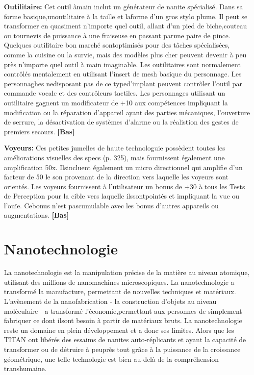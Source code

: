 \textbf{Outilitaire:} Cet outil àmain inclut un générateur de nanite spécialisé. Dans sa forme basique,unoutilitaire à la taille et laforme d'un gros stylo plume. Il peut se transformer en quasiment n'importe quel outil, allant d'un pied de biche,couteau ou tournevis de puissance à une fraiseuse en passant parune paire de pince. Quelques outilitaire bon marché sontoptimisés pour des tâches spécialisées, comme la cuisine ou la survie, mais des modèles plus cher peuvent devenir à peu près n'importe quel outil à main imaginable. Les outilitaires sont normalement contrôlés mentalement en utilisant l'insert de mesh basique du personnage. Les personnaghes nedisposant pas de ce typed'implant peuvent contrôler l'outil par commande vocale et des contrôleurs tactiles. Les personnages utilisant un outilitaire gagnent un modificateur de +10 aux compétences impliquant la modification ou la réparation d'appareil ayant des parties mécaniques, l'ouverture de serrure, la désactivation de systèmes d'alarme ou la réalistion des gestes de premiers secours. \textbf{[Bas]} 

\textbf{Voyeurs:} Ces petites jumelles de haute technologuie possèdent toutes les améliorations visuelles des specs (p. 325), mais fournissent également une amplification 50x. Ilsincluent également un micro directionnel qui amplifie d'un facteur de 50 le son provenant de la direction vers laquelle les voyeurs sont orientés. Les voyeurs fournissent à l'utilisateur un bonus de +30 à tous les Tests de Perception pour la cible vers laquelle ilssontpointés et impliquant la vue ou l'ouïe. Cebonus n'est pascumulable avec les bonus d'autres appareils ou augmentations. \textbf{[Bas]} 

\section{Nanotechnologie} \label{sec:nanotech} 

La nanotechnologie est la manipulation précise de la matière au niveau atomique, utilisant des millions de nanomachines microscopiques. La nanotechnologie a transformé la manufacture, permettant de nouvelles techniques et matériaux. L'avènement de la nanofabrication - la construction d'objets au niveau moléculaire - a transformé l'économie,permettant aux personnes de simplement fabriquer ce dont ilsont besoin à partir de matériaux bruts. La nanotechnologie reste un domaine en plein développement et a donc ses limites. Alors que les TITAN ont libérés des essaims de nanites auto-réplicants et ayant la capacité de transformer ou de détruire à peuprès tout grâce à la puissance de la croissance géométrique, une telle technologie est bien au-delà de la compréhension transhumaine. 

